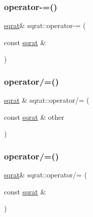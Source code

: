\mbox{\label{classsqrat_a774a997c67358fea54d41cd8f29bdd3a}} 
\subsubsection{\texorpdfstring{operator-\/=()}{operator-=()}\hspace{0.1cm}{\footnotesize\ttfamily [3/3]}}
{\footnotesize\ttfamily \mbox{\hyperlink{classsqrat}{sqrat}}\& sqrat\+::operator-\/= (\begin{DoxyParamCaption}\item[{const \mbox{\hyperlink{classsqrat}{sqrat}} \&}]{ }\end{DoxyParamCaption})}

\mbox{\label{classsqrat_a7c53e1f92b41f58404701af587d4e71a}} 
\subsubsection{\texorpdfstring{operator/=()}{operator/=()}\hspace{0.1cm}{\footnotesize\ttfamily [1/3]}}
{\footnotesize\ttfamily \mbox{\hyperlink{classsqrat}{sqrat}} \& sqrat\+::operator/= (\begin{DoxyParamCaption}\item[{const \mbox{\hyperlink{classsqrat}{sqrat}} \&}]{other }\end{DoxyParamCaption})}

\mbox{\label{classsqrat_a348781af63f0a423ad0a84342fdccb49}} 
\subsubsection{\texorpdfstring{operator/=()}{operator/=()}\hspace{0.1cm}{\footnotesize\ttfamily [2/3]}}
{\footnotesize\ttfamily \mbox{\hyperlink{classsqrat}{sqrat}}\& sqrat\+::operator/= (\begin{DoxyParamCaption}\item[{const \mbox{\hyperlink{classsqrat}{sqrat}} \&}]{ }\end{DoxyParamCaption})}

